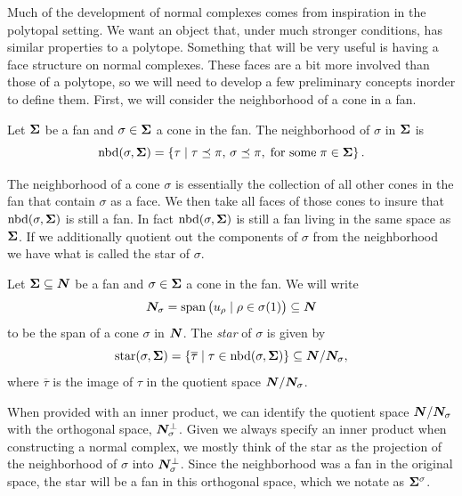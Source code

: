 \documentclass[12pt,oneside]{../../sfsuthesis}
\begin{document}
Much of the development of normal complexes comes from inspiration in the polytopal setting.
We want an object that, under much stronger conditions, has similar properties to a polytope.
Something that will be very useful is having a face structure on normal complexes.
These faces are a bit more involved than those of a polytope, so we will need to develop a few preliminary concepts inorder to define them.
First, we will consider the neighborhood of a cone in a fan.
\begin{definition}[Neighborhood]\th\label{def:nbr}
    Let \( {\bm{\Sigma}} \) be a fan and \( \sigma \in {\bm{\Sigma}} \) a cone in the fan.
    The neighborhood of \( \sigma \) in \( {\bm{\Sigma}} \) is
    \[
        \operatorname{nbd}(\sigma, {\bm{\Sigma}}) = \left\{ \tau \; \middle| \; \tau \preceq \pi, \, \sigma \preceq \pi, \;\text{for some}\; \pi \in {\bm{\Sigma}}\right\}.
    \]
\end{definition}
The neighborhood of a cone \( \sigma \) is essentially the collection of all other cones in the fan that contain \( \sigma \) as a face.
We then take all faces of those cones to insure that \( \operatorname{nbd}(\sigma, {\bm{\Sigma}}) \) is still a fan.
In fact \( \operatorname{nbd}(\sigma, {\bm{\Sigma}}) \) is still a fan living in the same space as \( {\bm{\Sigma}} \).
If we additionally quotient out the components of \( \sigma \) from the neighborhood we have what is called the star of \( \sigma \).
\begin{definition}[Star]\th\label{def:star}
    Let \( {\bm{\Sigma}} \subseteq \bm{N} \) be a fan and \( \sigma \in {\bm{\Sigma}} \) a cone in the fan.
    We will write
    \[
        \bm{N}_\sigma = \operatorname{span}\big(u_\rho \; | \; \rho \in \sigma(1)\big) \subseteq \bm{N}
    \]
    to be the span of a cone \( \sigma \) in \( \bm{N} \).
    The \emph{star} of \( \sigma \) is given by
    \[
        \operatorname{star}(\sigma, {\bm{\Sigma}}) = \left\{ \overline{\tau} \; \middle| \; \tau \in \operatorname{nbd}(\sigma, {\bm{\Sigma}}) \right\} \subseteq \bm{N} / \bm{N}_\sigma,
    \]
    where \( \overline{\tau} \) is the image of \( \tau \) in the quotient space \( \bm{N} / \bm{N}_\sigma \).
\end{definition}
When provided with an inner product, we can identify the quotient space \( \bm{N} / \bm{N}_\sigma\) with the orthogonal space, \( \bm{N}_\sigma^\bot \).
Given we always specify an inner product when constructing a normal complex, we mostly think of the star as the projection of the neighborhood of \( \sigma \) into \( \bm{N}_\sigma^\bot \).
Since the neighborhood was a fan in the original space, the star will be a fan in this orthogonal space, which we notate as  \( {\bm{\Sigma}}^{\sigma} \).
\end{document}
